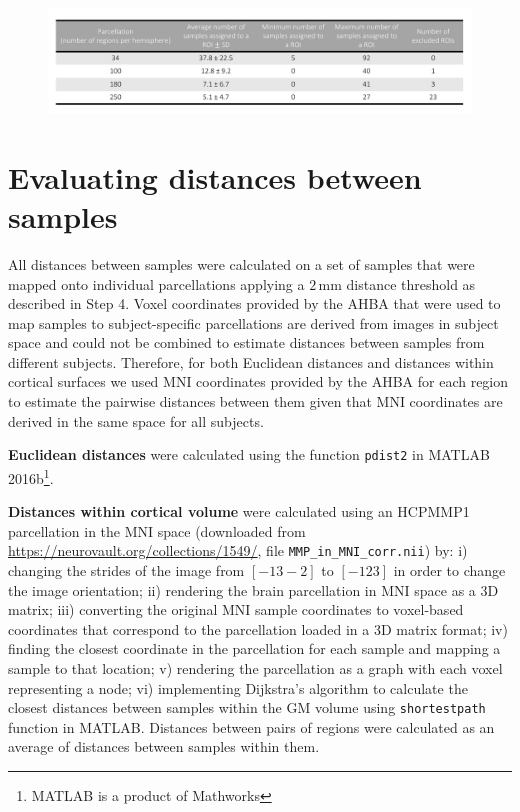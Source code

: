 \begin{figure}[h!]
  \centering
    \includegraphics[width=1\textwidth]{Chapter4/TableS4.pdf}
\label{TableS4}
\end{figure}

\section{Evaluating distances between samples}
\label{app:AppendixCh4_5}

All distances between samples were calculated on a set of samples that were mapped onto individual parcellations applying a $2\,$mm distance threshold as described in Step 4. Voxel coordinates provided by the AHBA that were used to map samples to subject-specific parcellations are derived from images in subject space and could not be combined to estimate distances between samples from different subjects. Therefore, for both Euclidean distances and distances within cortical surfaces we used MNI coordinates provided by the AHBA for each region to estimate the pairwise distances between them given that MNI coordinates are derived in the same space for all subjects.

\textbf{Euclidean distances} were calculated using the function \texttt{pdist2} in MATLAB 2016b\footnote{MATLAB is a product of Mathworks}.

\textbf{Distances within cortical volume} were calculated using an HCPMMP1 \citep{Glasser2016} parcellation in the MNI space (downloaded from \url{https://neurovault.org/collections/1549/}, file \texttt{MMP\_in\_MNI\_corr.nii})  by: i) changing the strides of the image from $[-1 3 -2]$ to $[-1 2 3]$ in order to change the image orientation; ii) rendering the brain parcellation in MNI space as a 3D matrix; iii) converting the original MNI sample coordinates to voxel-based coordinates that correspond to the parcellation loaded in a 3D matrix format; iv) finding the closest coordinate in the parcellation for each sample and mapping a sample to that location; v) rendering the parcellation as a graph with each voxel representing a node; vi) implementing Dijkstra’s algorithm \citep{Dijkstra1959} to calculate the closest distances between samples within the GM volume using \texttt{shortestpath} function in MATLAB. Distances between pairs of regions were calculated as an average of distances between samples within them.

